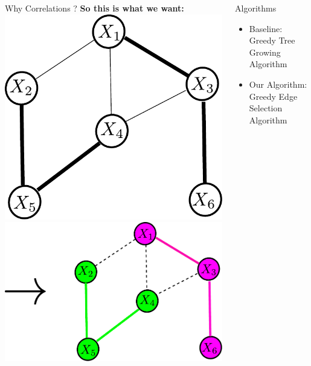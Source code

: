 \documentclass[serif,mathserif,final]{beamer}
\newcommand{\itemlinespace}{0.3in}
\newcommand{\insertlinespace}{\vspace{\itemlinespace}}
\begin{document}
\begin{frame}{}
\begin{columns}[t]
\begin{column}{0.49\linewidth}
\begin{block}{\Huge Why Correlations ?}
{        \textbf{So this is what we want:}  \\
        \insertlinespace
        \hspace{2in} 
        \includegraphics[width=4in]{figs/weighted} \hspace{0.4in}
        \includegraphics[width=6in]{figs/weighted_partition2}
      }
      \end{block}

    \end{column}%

    \begin{column}{0.49\linewidth}
      \begin{block}{\Huge Algorithms}
	    \begin{itemize}
		\huge
	    \item Baseline: Greedy Tree Growing Algorithm
	    \item Our Algorithm: Greedy Edge Selection Algorithm
	\end{itemize}


\end{block}
\end{column}
\end{columns}
\end{frame}
\end{document}
